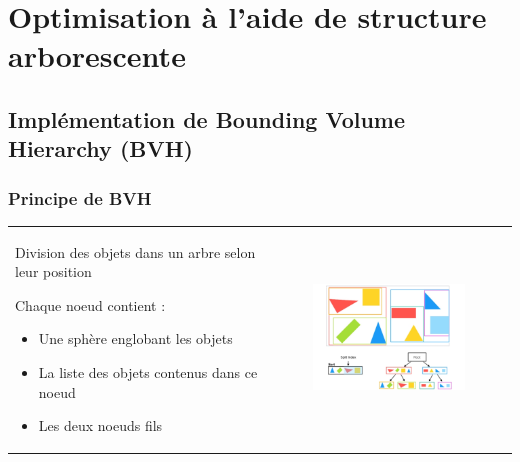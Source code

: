 \section{Optimisation à l'aide de structure arborescente}
\subsection{Implémentation de Bounding Volume Hierarchy (BVH)}
\begin{frame}[fragile]
\frametitle{Principe de BVH\esp}

\begin{tabular}{p{}p{}}
\flushleft  
Division des objets dans un arbre selon leur position 
\medskip 

Chaque noeud contient :
\begin{itemize}
    \item Une sphère englobant les objets 
    \item La liste des objets contenus dans ce noeud
    \item Les deux noeuds fils
\end{itemize}

    & \flushright 
        \begin{figure}[H]
            \includegraphics[width=6cm]{ImagesElio/BVH.png}
        \end{figure}
\end{tabular}

\end{frame}



